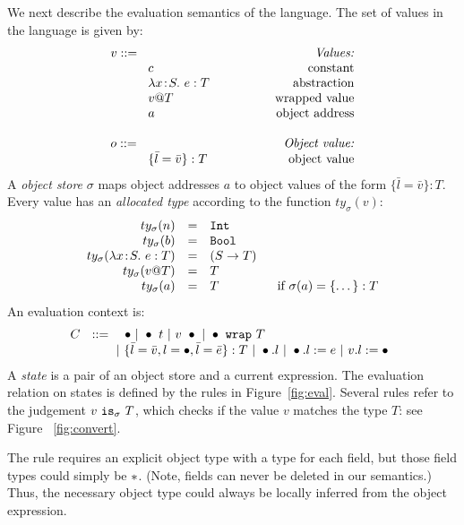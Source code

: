 \documentclass{article}
\makeatletter
\newcommand{\lam}[4]{\lambda#1\!:\!#2.\,\,#4:#3}
\newcommand{\lamt}[2]{#1\rightarrow #2}
\newcommand{\app}[2]{#1~#2}
\newcommand{\Int}{\t{Int}}
\newcommand{\Bool}{\t{Bool}}
\newcommand{\dynamic}{\t{*}}
\newcommand{\hole}{\bullet}
\renewcommand{\t}[1]{{\tt #1}}
\newcommand{\obje}[2]{\{#1\}:{#2}}
\newcommand{\objget}[2]{#1.#2}
\newcommand{\objset}[3]{#1.#2:=#3}
\newcommand{\wrapv}[2]{#1@#2}
\newcommand{\wrap}[2]{#1~\t{wrap}~#2}
\newcommand{\allocty}[1]{ty_{\sigma}(#1)}
\newcommand{\istype}[2]{#1~\t{is}_{\sigma}~ #2}
\makeatother
\begin{document}
We next describe the evaluation semantics of the language. 
The set of values in the language is given by:
\[
\begin{array}{llr}
	\mydefhead{v ::=\qquad\qquad\qquad\qquad\qquad}{Values:} 
	\mydefcase{c								}{constant} 
	\mydefcase{\lam{x}{S}{T}{e} 				}{abstraction} 
	\mydefcase{\wrapv{v}{T}	 				}{wrapped value} 
	\mydefcase{a								}{object address}
	\\
	\mydefhead{o ::=\qquad\qquad\qquad\qquad\qquad}{Object value:} 
	\mydefcase{\obje{\bar l = \bar v}{T}		}{object value}
\end{array}
\]
A \emph{object store} $\sigma$ maps object addresses $a$ to object values of the form $\obje{\bar{l}=\bar v}{T}$.
Every value has an \emph{allocated type} according to the function $\allocty{v}$:
\[
\begin{array}{rcll}
		\allocty{n}&=&\Int \\
		\allocty{b}&=&\Bool\\
		\allocty{\lam{x}{S}{T}{e}}&=&(\lamt{S}{T})\\
		\allocty{\wrapv{v}{T}}&=&T\\
		\allocty{a}&=&T   &\mbox{~~if } 		\sigma(a)=\obje{\dots}{T}
\end{array}
\]
An evaluation context is:
\[
C ~~::=
\begin{array}[t]{@{}l}
		~~~\hole
	~|~	\app{\hole}{t} 
	~|~	\app{v}{\hole}
	~|~ \wrap{\hole}{T} \\
	~|~ \obje{\bar l=\bar v,l=\hole, \bar l =\bar e}{T}
	~|~ \objget{\hole}{l}
	~|~ \objset{\hole}{l}{e}
	~|~ \objset{v}{l}{\hole} 
\end{array}
\]
A \emph{state} is a pair of an object store and a current expression.
The evaluation relation on states is defined by the rules in Figure~\ref{fig:eval}.
Several rules refer to the judgement $\istype{v}{T}$, which checks if the value $v$ matches the type $T$: see  Figure ~\ref{fig:convert}. 

The rule  requires an explicit object type with a type for each field,
but those field types could simply be $\dynamic$. (Note, fields can never be deleted in our semantics.)
Thus, the necessary object type could always be locally inferred from the object expression.
\end{document}
